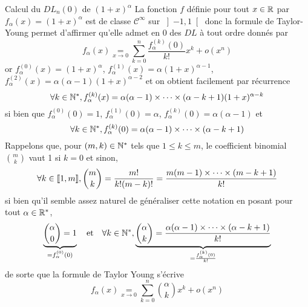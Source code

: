 \documentclass{article}
\begin{document}
\begin{question_kholle}{Calcul du $DL_{n}(0)$ de $(1+x)^{\alpha}$}
	La fonction $f$ définie pour tout $x\in\mathbb R$ par $f_{\alpha}(x)=(1+x)^{\alpha}$ est de classe $\mathcal{C}^{\infty}$ sur $\left]-1, 1\right[$ donc la formule de Taylor-Young permet d’affirmer qu’elle admet en 0 des $DL$ à tout ordre donnés par
	\[
		f_{\alpha}(x) \underset{x\to 0}{=} \sum_{k=0}^{n}\frac{f_{\alpha}^{(k)}(0)}{k!}x^{k} + o(x^{n})
	\]
	or $f_{\alpha}^{(0)}(x)=(1+x)^{\alpha}$, $f_{\alpha}^{(1)}(x)=\alpha(1+x)^{\alpha-1}$, $f_{\alpha}^{(2)}(x)=\alpha(\alpha-1)(1+x)^{\alpha-2}$ et on obtient facilement par récurrence
	\[
		\forall k\in\mathbb N^{*}, f_{\alpha}^{(k)}(x)=\alpha(\alpha-1)\times\cdots\times (\alpha-k+1)(1+x)^{\alpha-k}
	\]
	si bien que $f_{\alpha}^{(0)}(0)=1$, $f_{\alpha}^{(1)}(0)=\alpha$, $f_{\alpha}^{(k)}(0)=\alpha(\alpha-1)$ et
	\[
		\forall k\in\mathbb N^{*}, f_{\alpha}^{(k)}(0) = \alpha(\alpha-1)\times\cdots\times (\alpha-k+1)
	\]
	Rappelons que, pour $(m,k)\in\mathbb N^{*}$ tels que $1\leq k\leq m$, le coefficient binomial $\binom{m}{k}$ vaut 1 si $k=0$ et sinon,
	\[
		\forall k\in[\![ 1,m ]\!], \binom{m}{k}=\frac{m!}{k!(m-k)!}=\frac{m(m-1)\times\cdots\times (m-k+1)}{k!}
	\]
	si bien qu’il semble assez naturel de généraliser cette notation en posant pour tout $\alpha\in\mathbb R^{*}$,
	\[
		\underbrace{\binom{\alpha}{0}=1}_{=f_{\alpha}^{(0)}(0)} \quad\text{et}\quad \forall k\in\mathbb N^{*}, \underbrace{\binom{\alpha}{k}=\frac{\alpha(\alpha-1)\times \cdots \times (\alpha-k+1)}{k!}}_{=\frac{f_{\alpha}^{(k)}(0)}{k!}}
	\]
	de sorte que la formule de Taylor Young s’écrive
	\[
		f_{\alpha}(x) \underset{x\to 0}{=}\sum_{k=0}^{n}\binom{\alpha}{k}x^{k}+o(x^{n})
	\]
\end{question_kholle}
\end{document}
